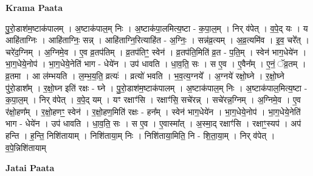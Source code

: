 \documentclass[17pt]{extarticle}
\begin{document}
\textbf{Krama Paata} \newline

पु॒रो॒डाश॑म॒ष्टाक॑पालम् । अ॒ष्टाक॑पाल॒म् निः । अ॒ष्टाक॑पा॒लमित्य॒ष्टा - क॒पा॒ल॒म् । निर् व॑पेत् । व॒पे॒द् यः । य आहि॑ताग्निः । आहि॑ताग्निः॒ सन्न् । आहि॑ताग्नि॒रित्याहि॑त - अ॒ग्निः॒ । सन्न॑व्र॒त्यम् । अ॒व्र॒त्यमि॑व । इ॒व॒ चरे᳚त् । चरे॑द॒ग्निम् । अ॒ग्निमे॒व । ए॒व व्र॒तप॑तिम् । व्र॒तप॑तिꣳ॒॒ स्वेन॑ । व्र॒तप॑ति॒मिति॑ व्र॒त - प॒ति॒म् । स्वेन॑ भाग॒धेये॑न । भा॒ग॒धेये॒नोप॑ । भा॒ग॒धेये॒नेति॑ भाग - धेये॑न । उप॑ धावति । धा॒व॒ति॒ सः । स ए॒व । ए॒वैन᳚म् । ए॒नं॒ ॅव्र॒तम् । व्र॒तमा । आ ल॑म्भयति । ल॒म्भ॒य॒ति॒ व्रत्यः॑ । व्रत्यो॑ भवति । भ॒व॒त्य॒ग्नये᳚ । अ॒ग्नये॑ रक्षो॒घ्ने । र॒क्षो॒घ्ने पु॑रो॒डाश᳚म् । र॒क्षो॒घ्न इति॑ रक्षः - घ्ने । पु॒रो॒डाश॑म॒ष्टाक॑पालम् । अ॒ष्टाक॑पाल॒म् निः । अ॒ष्टाक॑पाल॒मित्य॒ष्टा - क॒पा॒ल॒म् । निर् व॑पेत् । व॒पे॒द् यम् । यꣳ रक्षाꣳ॑सि । रक्षाꣳ॑सि॒ सचे॑रन्न् । सचे॑रन्न॒ग्निम् । अ॒ग्निमे॒व । ए॒व र॑क्षो॒हण᳚म् । र॒क्षो॒हणꣳ॒॒ स्वेन॑ । र॒क्षो॒हण॒मिति॑ रक्षः - हन᳚म् । स्वेन॑ भाग॒धेये॑न । भा॒ग॒धेये॒नोप॑ । भा॒ग॒धेये॒नेति॑ भाग - धेये॑न । उप॑ धावति । धा॒व॒ति॒ सः । स ए॒व । ए॒वास्मा᳚त् । अ॒स्मा॒द् रक्षाꣳ॑सि । रक्षाꣳ॒॒स्यप॑ । अप॑ हन्ति । ह॒न्ति॒ निशि॑तायाम् । निशि॑ताया॒म् निः । निशि॑ताया॒मिति॒ नि - शि॒ता॒या॒म् । निर् व॑पेत् । व॒पे॒न्निशि॑तायाम् \newline

\textbf{Jatai Paata} \newline
\end{document}
